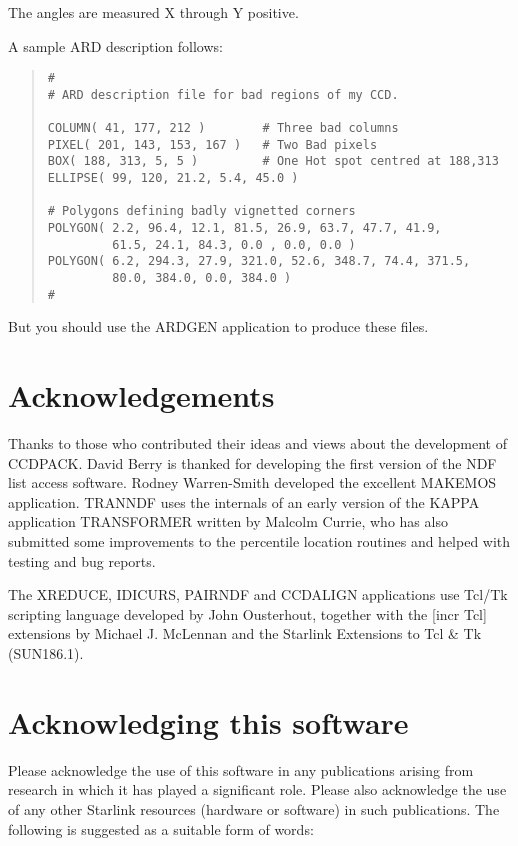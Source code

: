 \documentclass[twoside,11pt]{article}
\newcommand{\htmladdnormallink}[2]{#1}
\newcommand{\htmlref}[2]{#1}
\newcommand{\latexhtml}[2]{#1}
\newcommand{\xref}[3]{#1}
\renewcommand{\_}{\texttt{\symbol{95}}}
\newcommand{\ttsize}{\latexhtml{\small}{}}
\newenvironment{myquote}{\begin{quote}\ttsize}{\end{quote}}
\newcommand{\xroutine}[1]{\htmlref{{\sc #1}}{#1}}
\begin{document}
The angles are measured X through Y positive.

A sample ARD description follows:
\begin{myquote}
\begin{verbatim}
#
# ARD description file for bad regions of my CCD.

COLUMN( 41, 177, 212 )        # Three bad columns
PIXEL( 201, 143, 153, 167 )   # Two Bad pixels
BOX( 188, 313, 5, 5 )         # One Hot spot centred at 188,313
ELLIPSE( 99, 120, 21.2, 5.4, 45.0 )

# Polygons defining badly vignetted corners
POLYGON( 2.2, 96.4, 12.1, 81.5, 26.9, 63.7, 47.7, 41.9,
         61.5, 24.1, 84.3, 0.0 , 0.0, 0.0 )
POLYGON( 6.2, 294.3, 27.9, 321.0, 52.6, 348.7, 74.4, 371.5,
         80.0, 384.0, 0.0, 384.0 )
#
\end{verbatim}
\end{myquote}

But you should use the \xref{ARDGEN}{sun95}{ARDGEN} application to
produce these files.

\section{Acknowledgements}

Thanks to those who contributed their ideas and views about the
development of CCDPACK. David Berry is thanked for developing the
first version of the NDF list access software. Rodney Warren-Smith
developed the excellent \xroutine{MAKEMOS}
application. \xroutine{TRANNDF} uses the internals of an early version
of the KAPPA application \xref{TRANSFORMER}{sun95}{TRANSFORMER}
written by Malcolm Currie, who has also submitted some improvements
to the percentile location routines and helped with testing and bug reports.

The \xroutine{XREDUCE}, \xroutine{IDICURS}, \xroutine{PAIRNDF} and
\xroutine{CCDALIGN}  applications use
\htmladdnormallink{Tcl/Tk}{http://www.scriptics.com/}
scripting language developed by John Ousterhout, together with the
\htmladdnormallink{[incr Tcl]}{http://www.tcltk.com/itcl} extensions
by Michael J. McLennan and the
\xref{Starlink Extensions to Tcl \& Tk}{sun186}{} (SUN186.1).

\section{Acknowledging this software}
Please acknowledge the use of this software in any publications arising
from research in which it has played a significant role. Please also
acknowledge the use of any other Starlink resources (hardware or
software) in such publications. The following is suggested as a suitable
form of words:
\end{document}
